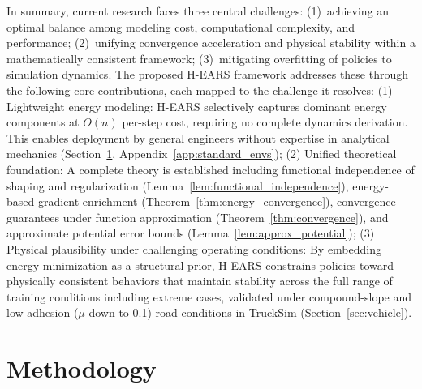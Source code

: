\documentclass[journal]{IEEEtran}
\begin{document}
	In summary, current research faces three central challenges: (1)~achieving an optimal balance among modeling cost, computational complexity, and performance; (2)~unifying convergence acceleration and physical stability within a mathematically consistent framework; (3)~mitigating overfitting of policies to simulation dynamics. The proposed H-EARS framework addresses these through the following core contributions, each mapped to the challenge it resolves: (1) Lightweight energy modeling: H-EARS selectively captures dominant energy components at $O(n)$ per-step cost, requiring no complete dynamics derivation. This enables deployment by general engineers without expertise in analytical mechanics (Section~\ref{sec:theoretical_framework}, Appendix~\ref{app:standard_envs}); (2) Unified theoretical foundation: A complete theory is established including functional independence of shaping and regularization (Lemma~\ref{lem:functional_independence}), energy-based gradient enrichment (Theorem~\ref{thm:energy_convergence}), convergence guarantees under function approximation (Theorem~\ref{thm:convergence}), and approximate potential error bounds (Lemma~\ref{lem:approx_potential}); (3) Physical plausibility under challenging operating conditions: By embedding energy minimization as a structural prior, H-EARS constrains policies toward physically consistent behaviors that maintain stability across the full range of training conditions including extreme cases, validated under compound-slope and low-adhesion ($\mu$ down to 0.1) road conditions in TruckSim (Section~\ref{sec:vehicle}).
	
	\section{Methodology}
	\label{sec:theoretical_framework}
	
\end{document}
